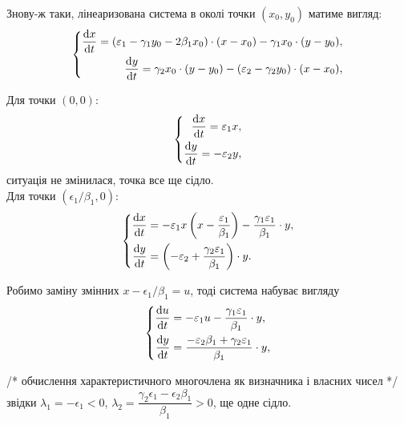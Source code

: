 Знову-ж таки, лінеаризована система в околі точки $(x_0, y_0)$ матиме вигляд:
\begin{equation}
    \left\{
    \begin{aligned}
    \frac{\mathop{}\!\mathrm{d} x}{\mathop{}\!\mathrm{d} t} = (\varepsilon_1 - \gamma_1 y_0 - 2 \beta_1 x_0) \cdot (x - x_0) - \gamma_1  x_0 \cdot (y - y_0), \\
    \frac{\mathop{}\!\mathrm{d} y}{\mathop{}\!\mathrm{d} t} = \gamma_2  x_0 \cdot (y - y_0) - (\varepsilon_2 - \gamma_2 y_0) \cdot (x - x_0),
\end{aligned}
\right.
\end{equation}

Для точки $(0, 0)$:
\begin{equation}
    \left\{
    \begin{aligned}
    \frac{\mathop{}\!\mathrm{d} x}{\mathop{}\!\mathrm{d} t} = \varepsilon_1 x, \\
    \frac{\mathop{}\!\mathrm{d} y}{\mathop{}\!\mathrm{d} t} = - \varepsilon_2 y,
\end{aligned}
\right.
\end{equation}
ситуація не змінилася, точка все ще сідло. \\

Для точки $(\epsilon_1 / \beta_1, 0)$:
\begin{equation}
    \left\{
    \begin{aligned}
    \frac{\mathop{}\!\mathrm{d} x}{\mathop{}\!\mathrm{d} t} &= - \varepsilon_1 x \left( x - \frac{\varepsilon_1}{\beta_1} \right) - \frac{\gamma_1 \varepsilon_1}{\beta_1} \cdot y, \\
    \frac{\mathop{}\!\mathrm{d} y}{\mathop{}\!\mathrm{d} t} &= \left( - \varepsilon_2 + \frac{\gamma_2 \varepsilon_1}{\beta_1} \right) \cdot y.
\end{aligned}
\right.
\end{equation}

Робимо заміну змінних $x - \epsilon_1 / \beta_1 = u$, тоді система набуває вигляду
\begin{equation}
    \left\{
    \begin{aligned}
    \frac{\mathop{}\!\mathrm{d} u}{\mathop{}\!\mathrm{d} t} &= - \varepsilon_1 u - \frac{\gamma_1 \varepsilon_1}{\beta_1} \cdot y, \\
    \frac{\mathop{}\!\mathrm{d} y}{\mathop{}\!\mathrm{d} t} &= \frac{- \varepsilon_2 \beta_1 + \gamma_2 \varepsilon_1}{\beta_1} \cdot y,
\end{aligned}
\right.
\end{equation}

/* обчислення характеристичного многочлена як визначника і власних чисел */ \\

звідки $\lambda_1 = - \epsilon_1 < 0$, $\lambda_2 = \dfrac{\gamma_2 \epsilon_1 - \epsilon_2 \beta_1}{\beta_1} > 0$, ще одне сідло. \\

